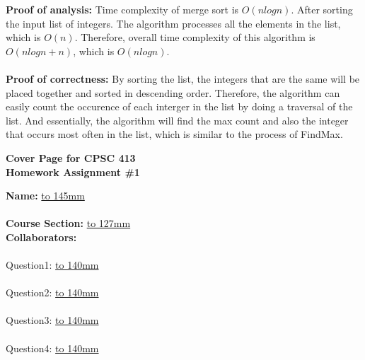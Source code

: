 \documentclass[11pt]{article}
\theoremstyle{definition}
\begin{document}
\begin{enumerate}
\begin{algorithm}[H]
\end{algorithm}

\textbf{Proof of analysis:} Time complexity of merge sort is $O(nlogn)$. After sorting the input list of integers. The algorithm processes all the elements in the list, which is $O(n)$. Therefore, overall time complexity of this algorithm is $O(nlogn+n)$, which is $O(nlogn)$.\\
\\
\textbf{Proof of correctness:} By sorting the list, the integers that are the same will be placed together and sorted in descending order. Therefore, the algorithm can easily count the occurence of each interger in the list by doing a traversal of the list. And essentially, the algorithm will find the max count and also the integer that occurs most often in the list, which is similar to the process of FindMax.

\end{enumerate}

\newpage

\begin{center}
\textbf{{\LARGE Cover Page for CPSC 413 \\Homework Assignment \#1}}
\end{center}

\textbf{Name:} \underline{\hbox to 145mm{}}
\\\\
\textbf{Course Section:} \underline{\hbox to 127mm{}}
\\

\textbf{Collaborators:}
\\\\
Question1: \underline{\hbox to 140mm{}}
\\\\
Question2: \underline{\hbox to 140mm{}}
\\\\
Question3: \underline{\hbox to 140mm{}}
\\\\
Question4: \underline{\hbox to 140mm{}}
\\
\end{document}
